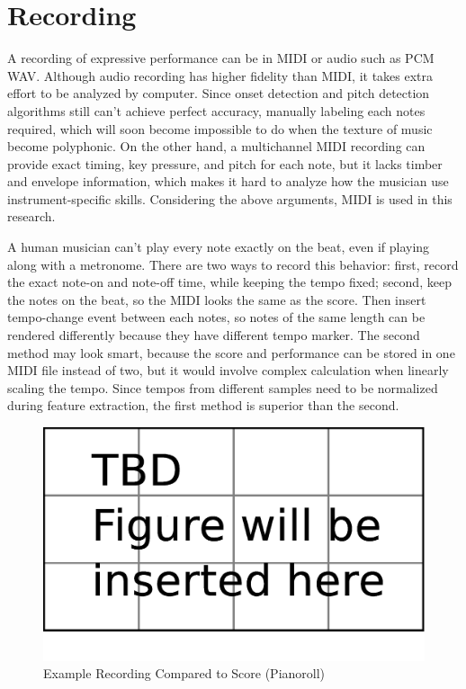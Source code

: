 \section{Recording}
A recording of expressive performance can be in MIDI or audio such as PCM WAV. Although audio recording has higher fidelity than MIDI, it takes extra effort to be analyzed by computer. Since onset detection and pitch detection algorithms still can't achieve perfect accuracy, manually labeling each notes required, which will soon become impossible to do when the texture of music become polyphonic. On the other hand, a multichannel MIDI recording can provide exact timing, key pressure, and pitch for each note, but it lacks timber and envelope information, which makes it hard to analyze how the musician use instrument-specific skills. Considering the above arguments, MIDI is used in this research.

A human musician can't play every note exactly on the beat, even if playing along with a metronome. There are two ways to record this behavior: first, record the exact note-on and note-off time, while keeping the tempo fixed; second, keep the notes on the beat, so the MIDI looks the same as the score. Then insert tempo-change event between each notes, so notes of the same length can be rendered differently because they have different tempo marker. The second method may look smart, because the score and performance can be stored in one MIDI file instead of two, but it would involve complex calculation when linearly scaling the tempo. Since tempos from different samples need to be normalized during feature extraction, the first method is superior  than the second.

\begin{figure}[tp]
   \begin{center}
      \includegraphics[width=\textwidth]{fig/TBDFigure}

   \end{center}
   \caption{Example Recording Compared to Score (Pianoroll)}
   \label{fig:exprecording}
\end{figure}


